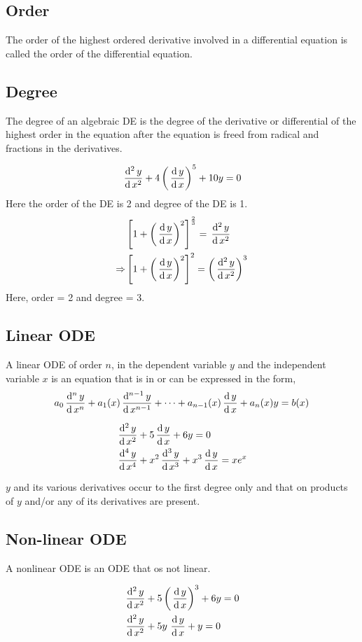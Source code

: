 \documentclass[12pt,oneside,a4paper]{article}
\begin{document}
\subsection{Order}
The order of the highest ordered derivative involved in a differential equation is called the order of the differential equation.
\subsection{Degree}
The degree of an algebraic DE is the degree of the derivative or differential of the highest order in the equation after the equation is freed from radical and fractions in the derivatives.

\begin{ex}
    \[\,\frac{\mathrm{d}^{2}\, y}{\mathrm{d}\, x^{2}}+4\left(\,\frac{\mathrm{d}\,y}{\mathrm{d}\,x}\right)^5+10y=0\]
    Here the order of the DE is 2 and degree of the DE is 1.
    \begin{align*}
                    & \left[1+\left(\,\frac{\mathrm{d}\,y}{\mathrm{d}\,x}\right)^2\right]^\frac{2}{3}=\,\frac{\mathrm{d}^{2}\, y}{\mathrm{d}\, x^{2}}      \\
        \Rightarrow & \left[1+\left(\,\frac{\mathrm{d}\,y}{\mathrm{d}\,x}\right)^2\right]^2=\left(\,\frac{\mathrm{d}^{2}\, y}{\mathrm{d}\, x^{2}}\right)^3
    \end{align*}
    Here, order = 2 and degree = 3.
\end{ex}
\subsection{Linear ODE}
A linear ODE  of order $ n $, in the dependent variable $ y $ and the independent variable $ x $ is an equation that is in or can be expressed in the form,
\[a_0 \,\frac{\mathrm{d}^{n}\, y}{\mathrm{d}\, x^{n}}+a_1(x)\,\frac{\mathrm{d}^{n-1}\, y}{\mathrm{d}\, x^{n-1}}+\dots+a_{n-1}(x)\,\frac{\mathrm{d}\,y}{\mathrm{d}\,x}+a_n(x)y=b(x)\]
\begin{ex}
    \begin{align*}
         & \,\frac{\mathrm{d}^{2}\, y}{\mathrm{d}\, x^{2}}+5\,\frac{\mathrm{d}\,y}{\mathrm{d}\,x}+6y=0                  \\
         & \,\frac{\mathrm{d}^{4}\, y}{\mathrm{d}\, x^{4}}+x^2\,\frac{\mathrm{d}^{3}\, y}{\mathrm{d}\, x^{3}}+x^3\,\frac{\mathrm{d}\,y}{\mathrm{d}\,x}=xe^x
    \end{align*}
\end{ex}
\begin{rem}
    $ y $ and its various derivatives occur to the first degree only and that on products of $ y  $ and/or any of its derivatives are present.
\end{rem}
\subsection{Non-linear ODE}
A nonlinear ODE is an ODE that os not linear.
\begin{ex}
    \begin{align*}
         & \,\frac{\mathrm{d}^{2}\, y}{\mathrm{d}\, x^{2}}+5\left(\,\frac{\mathrm{d}\,y}{\mathrm{d}\,x}\right)^3+6y=0 \\
         & \,\frac{\mathrm{d}^{2}\, y}{\mathrm{d}\, x^{2}}+5y\,\,\frac{\mathrm{d}\,y}{\mathrm{d}\,x}+y=0
    \end{align*}
\end{ex}
\end{document}
